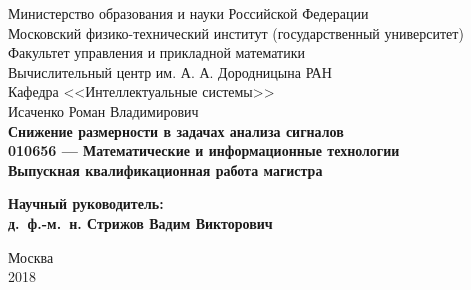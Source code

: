\documentclass[12pt,oneside]{article}
\theoremstyle{definition}
\begin{document}
\begin{titlepage}
	\thispagestyle{empty}
	\begin{center}
		\sc
		Министерство образования и науки Российской Федерации\\
		Московский физико-технический институт
		{\rm(государственный университет)}\\
		Факультет управления и прикладной математики\\
		Вычислительный центр им. А. А. Дородницына РАН\\
		Кафедра <<Интеллектуальные системы>>\\[35mm]
		\rm\large
		Исаченко Роман Владимирович\\[10mm]
		\bf\Large
		Снижение размерности в задачах анализа сигналов\\[10mm]
		\rm\normalsize
		010656 --- Математические и информационные технологии\\[10mm]
		\sc
		Выпускная квалификационная работа магистра\\[10mm]
	\end{center}
	\hfill\parbox{80mm}{
		\begin{flushleft}
			\bf
			Научный руководитель:\\
			\rm
			д.~ф.-м.~н. Стрижов Вадим Викторович\\[5cm]
		\end{flushleft}
	}
	
	\vspace{\fill}
	\begin{center}
		Москва\\
		2018
	\end{center}
\end{titlepage}
\end{document}

